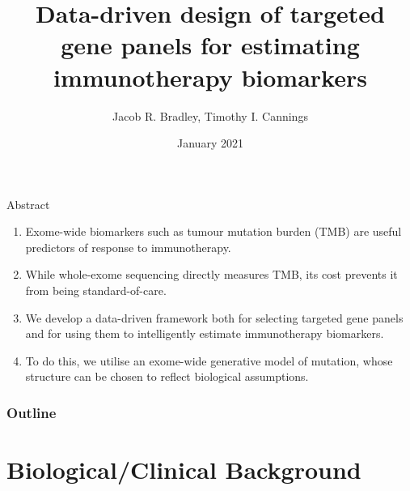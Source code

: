 \documentclass{beamer}
\title[Data-driven targeted gene panels]{Data-driven design of targeted gene panels for estimating immunotherapy biomarkers}
\author[Bradley and Cannings]{Jacob R. Bradley, Timothy I. Cannings}
\institute[]{University of Edinburgh}
\date{January 2021}
\begin{document}
\begin{frame}
\titlepage
\end{frame}

\begin{frame}{Abstract}
\begin{enumerate}[I]
    \item Exome-wide biomarkers such as tumour mutation burden (TMB) are useful predictors of response to immunotherapy.
    \item While whole-exome sequencing directly measures TMB, its cost prevents it from being standard-of-care.
    \item We develop a data-driven framework both for selecting targeted gene panels and for using them to intelligently estimate immunotherapy biomarkers.
    \item To do this, we utilise an exome-wide generative model of mutation, whose structure can be chosen to reflect biological assumptions.
\end{enumerate}
\end{frame}


\begin{frame}
\frametitle{Outline}
\tableofcontents
\end{frame}

\section{Biological/Clinical Background}
\end{document}
